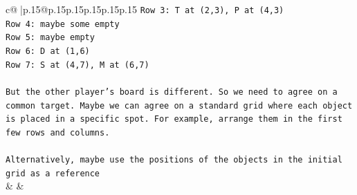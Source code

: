 \documentclass{article}
\begin{document}
{\begin{supertabular}{c@{$\;$}|p{.15\linewidth}@{}p{.15\linewidth}p{.15\linewidth}p{.15\linewidth}p{.15\linewidth}p{.15\linewidth}}
{{{\texttt{Row 3: T at (2,3), P at (4,3)} \\
\texttt{Row 4: maybe some empty} \\
\texttt{Row 5: maybe empty} \\
\texttt{Row 6: D at (1,6)} \\
\texttt{Row 7: S at (4,7), M at (6,7)} \\
\\ 
\texttt{But the other player's board is different. So we need to agree on a common target. Maybe we can agree on a standard grid where each object is placed in a specific spot. For example, arrange them in the first few rows and columns.} \\
\\ 
\texttt{Alternatively, maybe use the positions of the objects in the initial grid as a reference} \\
            }
        }
    }
    & & \\ \\


\end{supertabular}}
\end{document}
